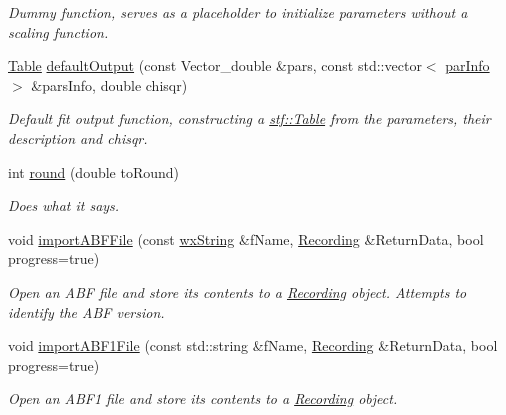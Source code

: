 \begin{DoxyCompactItemize}
\begin{DoxyCompactList}\small\item\em Dummy function, serves as a placeholder to initialize parameters without a scaling function. \item\end{DoxyCompactList}\item 
\hypertarget{group__stfgen_gacb88ca09147b65f75b9347d0d2462cef}{
\hyperlink{classstf_1_1Table}{Table} \hyperlink{group__stfgen_gacb88ca09147b65f75b9347d0d2462cef}{defaultOutput} (const Vector\_\-double \&pars, const std::vector$<$ \hyperlink{structstf_1_1parInfo}{parInfo} $>$ \&parsInfo, double chisqr)}
\label{group__stfgen_gacb88ca09147b65f75b9347d0d2462cef}

\begin{DoxyCompactList}\small\item\em Default fit output function, constructing a \hyperlink{classstf_1_1Table}{stf::Table} from the parameters, their description and chisqr. \item\end{DoxyCompactList}\item 
int \hyperlink{group__stfgen_ga555e6d942a4dc2437482dbe9c5fed9ab}{round} (double toRound)
\begin{DoxyCompactList}\small\item\em Does what it says. \item\end{DoxyCompactList}\item 
void \hyperlink{namespacestf_a7643667703aae7da632f9b4406837713}{importABFFile} (const \hyperlink{classwxString}{wxString} \&fName, \hyperlink{classRecording}{Recording} \&ReturnData, bool progress=true)
\begin{DoxyCompactList}\small\item\em Open an ABF file and store its contents to a \hyperlink{classRecording}{Recording} object. Attempts to identify the ABF version. \item\end{DoxyCompactList}\item 
void \hyperlink{namespacestf_a86f8b109ca14c06e0b90b9862e34fca8}{importABF1File} (const std::string \&fName, \hyperlink{classRecording}{Recording} \&ReturnData, bool progress=true)
\begin{DoxyCompactList}\small\item\em Open an ABF1 file and store its contents to a \hyperlink{classRecording}{Recording} object. \item\end{DoxyCompactList}\item 

\end{DoxyCompactItemize}
